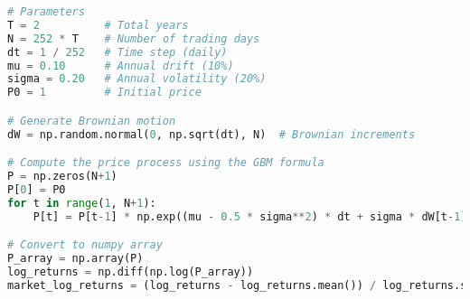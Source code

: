 \documentclass[oneside, a4paper, onecolumn, 11pt]{article}
\begin{document}
\begin{lstlisting}[language=Python, caption=Simulating a stock price using Geometric Brownian Motion , label=code:Brownian]
# Parameters
T = 2          # Total years
N = 252 * T    # Number of trading days
dt = 1 / 252   # Time step (daily)
mu = 0.10      # Annual drift (10%)
sigma = 0.20   # Annual volatility (20%)
P0 = 1         # Initial price

# Generate Brownian motion
dW = np.random.normal(0, np.sqrt(dt), N)  # Brownian increments

# Compute the price process using the GBM formula
P = np.zeros(N+1)
P[0] = P0
for t in range(1, N+1):
    P[t] = P[t-1] * np.exp((mu - 0.5 * sigma**2) * dt + sigma * dW[t-1])

# Convert to numpy array
P_array = np.array(P)
log_returns = np.diff(np.log(P_array))
market_log_returns = (log_returns - log_returns.mean()) / log_returns.std()
\end{lstlisting}
\end{document}
